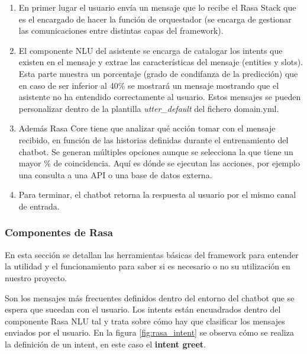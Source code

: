 \begin{enumerate}
    \item En primer lugar el usuario envía un mensaje que lo recibe el Rasa Stack que es el encargado de hacer la función de orquestador (se encarga de gestionar las comunicaciones entre distintas capas del framework).
    \item El componente NLU del asistente se encarga de catalogar los intents que existen en el mensaje y extrae las características del mensaje (entities y slots). Esta parte muestra un porcentaje (grado de condifanza de la predicción) que en caso de ser inferior al 40\% se mostrará un mensaje mostrando que el asistente no ha entendido correctamente al usuario. Estos mensajes se pueden personalizar dentro de la plantilla \textit{utter\_default} del fichero domain.yml.
    \item Además Rasa Core tiene que analizar qué acción tomar con el mensaje recibido, en función de las historias definidas durante el entrenamiento del chatbot. Se generan múltiples opciones aunque se selecciona la que tiene un mayor \% de coincidencia. Aquí es dónde se ejecutan las acciones, por ejemplo una consulta a una API o una base de datos externa.
    \item Para terminar, el chatbot retorna la respuesta al usuario por el mismo canal de entrada.
\end{enumerate}
    
\subsubsection{Componentes de Rasa}

En esta sección se detallan las herramientas básicas del framework para entender la utilidad y el funcionamiento para saber si es necesario o no su utilización en nuestro proyecto.
\vspace{1cm}

Son los mensajes más frecuentes definidos dentro del entorno del chatbot que se espera que sucedan con el usuario. Los intents están encuadrados dentro del componente Rasa NLU tal y trata sobre cómo hay que clasificar los mensajes enviados por el usuario. En la figura \ref{fig:rasa_intent} se observa cómo se realiza la definición de un intent, en este caso el \textbf{intent greet}.


